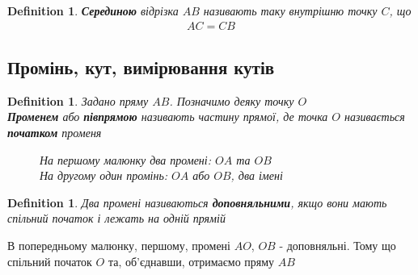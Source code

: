 \documentclass[a4paper, 14pt]{extarticle}
\theoremstyle{theoremdd}
\theoremstyle{theoremdd}
\newtheorem{definition}[theorem]{Definition}
\theoremstyle{theoremdd}
\theoremstyle{theoremdd}
\theoremstyle{theoremdd}
\theoremstyle{theoremdd}
\theoremstyle{theoremdd}
\theoremstyle{theoremdd}
\begin{document}
\begin{definition}
\textbf{Серединою} відрізка $AB$ називають таку внутрішню точку $C$, що
\begin{align*}
AC = CB
\end{align*}
\begin{figure}[H]
\centering
{}
\end{figure}
\end{definition}

\subsection{Промінь, кут, вимірювання кутів}
\begin{definition}
Задано пряму $AB$. Позначимо деяку точку $O$\\
\textbf{Променем} або \textbf{півпрямою} називають частину прямої, де точка $O$ називається \textbf{початком} променя
\begin{figure}[H]
\centering
{}
\qquad
{}
\caption*{На першому малюнку два промені: $OA$ та $OB$\\
На другому один промінь: $OA$ або $OB$, два імені}
\end{figure}
\end{definition}

\begin{definition}
Два промені називаються \textbf{доповняльними}, якщо вони мають спільний початок і лежать на одній прямій
\end{definition}
В попередньому малюнку, першому, промені $AO$, $OB$ - доповняльні. Тому що спільний початок $O$ та, об'єднавши, отримаємо пряму $AB$
\end{document}
